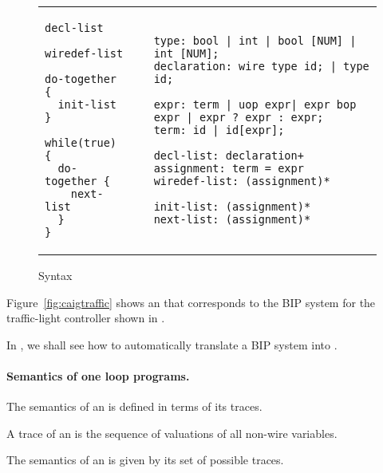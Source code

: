 \begin{figure*}
\begin{tabular}{p{3cm}p{0.5cm}p{10cm}}
\begin{lstlisting}
decl-list

wiredef-list

do-together {
  init-list 
}

while(true) {
  do-together {
    next-list
  } 
}
\end{lstlisting}
&
&
\begin{lstlisting}
type: bool | int | bool [NUM] | int [NUM]; 
declaration: wire type id; | type id;

expr: term | uop expr| expr bop expr | expr ? expr : expr;
term: id | id[expr]; 

decl-list: declaration+
assignment: term = expr
wiredef-list: (assignment)*

init-list: (assignment)* 
next-list: (assignment)* 
\end{lstlisting}
\end{tabular}
\caption{\caig Syntax}
\label{fig:gr}
\end{figure*}
%
\begin{example}
Figure~\ref{fig:caigtraffic} shows an \caig that corresponds to the BIP system for the traffic-light controller shown in . 

\end{example}
%
In , we shall see how to automatically translate a BIP system into \caig.
%
\paragraph{Semantics of one loop programs.}
%
The semantics of an \caig is defined in terms of its traces.
%
\begin{definition}
A trace of an \caig is the sequence of valuations of all non-wire variables.
\end{definition}
%
The semantics of an \caig is given by its set of possible traces.  
%